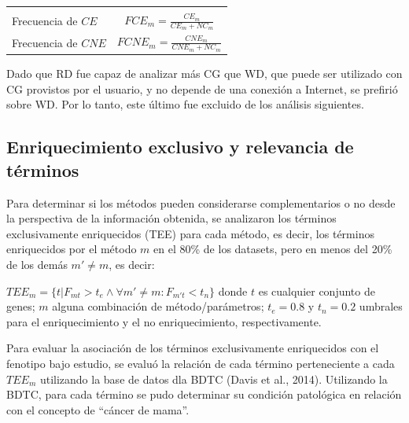 \documentclass[12pt,twoside]{reedthesis}
\begin{document}
\begin{longtable}[]{@{}lc@{}}
\begin{minipage}[t]{0.50\columnwidth}
\end{minipage}\tabularnewline
\begin{minipage}[t]{0.44\columnwidth}\raggedright
Frecuencia de \(CE\)\strut
\end{minipage} & \begin{minipage}[t]{0.50\columnwidth}\centering
\(FCE_m=\frac{CE_m}{CE_m+NC_m}\)\strut
\end{minipage}\tabularnewline
\begin{minipage}[t]{0.44\columnwidth}\raggedright
Frecuencia de \(CNE\)\strut
\end{minipage} & \begin{minipage}[t]{0.50\columnwidth}\centering
\(FCNE_m=\frac{CNE_m}{CNE_m+NC_m}\)\strut
\end{minipage}\tabularnewline
\bottomrule
\end{longtable}
\par

Dado que RD fue capaz de analizar más CG que WD, que puede ser utilizado con CG provistos por el usuario, y no depende de una conexión a Internet, se prefirió sobre WD. Por lo tanto, este último fue excluido de los análisis siguientes.

\hypertarget{enriquecimiento-exclusivo-y-relevancia-de-tuxe9rminos}{%
\subsection{Enriquecimiento exclusivo y relevancia de términos}\label{enriquecimiento-exclusivo-y-relevancia-de-tuxe9rminos}}

\par

Para determinar si los métodos pueden considerarse complementarios o no desde la perspectiva de la información obtenida, se analizaron los términos exclusivamente enriquecidos (TEE) para cada método, es decir, los términos enriquecidos por el método \(m\) en el 80\% de los datasets, pero en menos del 20\% de los demás \(m' \neq m\), es decir:

\(TEE_m=\{t|F_{mt}>t_e \wedge \forall m' \neq m : F_{m't} < t_n \}\)
donde \(t\) es cualquier conjunto de genes; \(m\) alguna combinación de método/parámetros; \(t_e=0.8\) y \(t_n=0.2\) umbrales para el enriquecimiento y el no enriquecimiento, respectivamente.

\par

Para evaluar la asociación de los términos exclusivamente enriquecidos con el fenotipo bajo estudio, se evaluó la relación de cada término perteneciente a cada \(TEE_m\) utilizando la base de datos dla BDTC (Davis et al., 2014). Utilizando la BDTC, para cada término se pudo determinar su condición patológica en relación con el concepto de ``cáncer de mama''.
\end{document}
